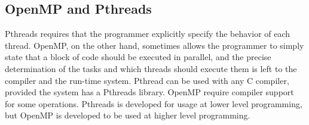 \documentclass[12pt]{article}
\begin{document}
\subsection{OpenMP and Pthreads}
Pthreads requires that the programmer explicitly specify the behavior of each thread. OpenMP, on the other hand, sometimes allows the programmer to simply state that a block of code should be executed in parallel, and the precise determination of the tasks and which threads should execute them is left to the compiler and the run-time system. Pthread can be used with any C compiler, provided the system has a Pthreads library. OpenMP require compiler support for some operations. Pthreads is developed for usage at lower level programming, but OpenMP is developed to be used at higher level programming.
\end{document}
